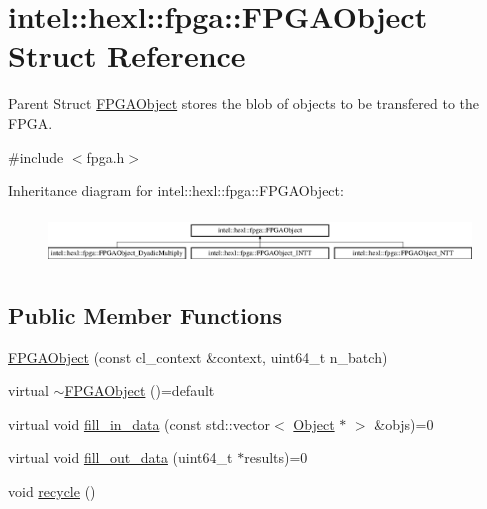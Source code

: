 \hypertarget{structintel_1_1hexl_1_1fpga_1_1FPGAObject}{\section{intel\-:\-:hexl\-:\-:fpga\-:\-:F\-P\-G\-A\-Object Struct Reference}
\label{structintel_1_1hexl_1_1fpga_1_1FPGAObject}
}


Parent Struct \hyperlink{structintel_1_1hexl_1_1fpga_1_1FPGAObject}{F\-P\-G\-A\-Object} stores the blob of objects to be transfered to the F\-P\-G\-A.  




{\ttfamily \#include $<$fpga.\-h$>$}

Inheritance diagram for intel\-:\-:hexl\-:\-:fpga\-:\-:F\-P\-G\-A\-Object\-:\begin{figure}[H]
\begin{center}
\leavevmode
\includegraphics[height=1.377614cm]{structintel_1_1hexl_1_1fpga_1_1FPGAObject}
\end{center}
\end{figure}
\subsection*{Public Member Functions}
\begin{DoxyCompactItemize}
\item 
\hyperlink{structintel_1_1hexl_1_1fpga_1_1FPGAObject_a1b07c859e7c9205ac12cdb7cd0ba61f7}{F\-P\-G\-A\-Object} (const cl\-\_\-context \&context, uint64\-\_\-t n\-\_\-batch)
\item 
virtual \hyperlink{structintel_1_1hexl_1_1fpga_1_1FPGAObject_adecdea2bd81579b973e9292045c8d400}{$\sim$\-F\-P\-G\-A\-Object} ()=default
\item 
virtual void \hyperlink{structintel_1_1hexl_1_1fpga_1_1FPGAObject_abd665113bfb3b0e7a33e09078f01ae43}{fill\-\_\-in\-\_\-data} (const std\-::vector$<$ \hyperlink{structintel_1_1hexl_1_1fpga_1_1Object}{Object} $\ast$ $>$ \&objs)=0
\item 
virtual void \hyperlink{structintel_1_1hexl_1_1fpga_1_1FPGAObject_a954c4c75077a7c406f6c81517ea7bb04}{fill\-\_\-out\-\_\-data} (uint64\-\_\-t $\ast$results)=0
\item 
void \hyperlink{structintel_1_1hexl_1_1fpga_1_1FPGAObject_a0131d230161e662b63af86099177beb7}{recycle} ()
\end{DoxyCompactItemize}
